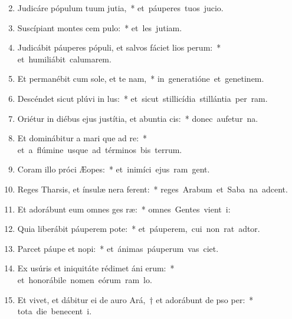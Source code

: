 \begin{flushleft}
\begin{enumerate}[leftmargin=*]
\setcounter{enumi}{1}

\item Judicáre pópulum tuum  jutia,~* \mbox{et páuperes tuos  jucio.}
\item Suscípiant montes cem pulo:~* \mbox{et les jutiam.}
\item Judicábit páuperes pópuli, et salvos fáciet lios perum:~* \mbox{et humiliábit calumarem.}
\item Et permanébit cum sole, et te nam,~* \mbox{in generatióne et genetinem.}
\item Descéndet sicut plúvi in lus:~* \mbox{et sicut stillicídia stillántia per ram.}
\item Oriétur in diébus ejus justítia, et abuntia cis:~* \mbox{donec aufetur na.}
\item Et dominábitur a mari que ad re:~* \mbox{et a flúmine usque ad términos bis terrum.}
\item Coram illo próci Æopes:~* \mbox{et inimíci ejus ram gent.}
\item Reges Tharsis, et ínsulæ nera ferent:~* \mbox{reges Arabum et Saba na adcent.}
\item Et adorábunt eum omnes ges ræ:~* \mbox{omnes Gentes vient i:}
\item Quia liberábit páuperem  pote:~* \mbox{et páuperem, cui non rat adtor.}
\item Parcet páupe et nopi:~* \mbox{et ánimas páuperum vas ciet.}
\item Ex usúris et iniquitáte rédimet áni erum:~* \mbox{et honorábile nomen eórum ram lo.}
\item Et vivet, et dábitur ei de auro Ará,~† et adorábunt de pso per:~* \mbox{tota die benecent i.}

\end{enumerate}
\end{flushleft}
